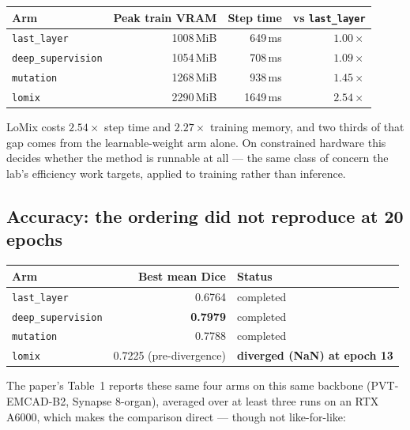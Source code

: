 \documentclass[11pt,a4paper]{article}
\newcommand{\code}[1]{\texttt{\small #1}}
\begin{document}
\begin{center}
\begin{tabular}{@{}lrrr@{}}
\toprule
\textbf{Arm} & \textbf{Peak train VRAM} & \textbf{Step time} &
\textbf{vs \code{last\_layer}} \\
\midrule
\code{last\_layer} & 1008\,MiB & 649\,ms & $1.00\times$ \\
\code{deep\_supervision} & 1054\,MiB & 708\,ms & $1.09\times$ \\
\code{mutation} & 1268\,MiB & 938\,ms & $1.45\times$ \\
\code{lomix} & 2290\,MiB & 1649\,ms & $\mathbf{2.54\times}$ \\
\bottomrule
\end{tabular}
\end{center}

LoMix costs $2.54\times$ step time and $2.27\times$ training memory, and two
thirds of that gap comes from the learnable-weight arm alone. On constrained
hardware this decides whether the method is runnable at all --- the same class
of concern the lab's efficiency work targets, applied to training rather than
inference.

\subsection{Accuracy: the ordering did not reproduce at 20 epochs}

\begin{center}
\begin{tabular}{@{}lrl@{}}
\toprule
\textbf{Arm} & \textbf{Best mean Dice} & \textbf{Status} \\
\midrule
\code{last\_layer} & 0.6764 & completed \\
\code{deep\_supervision} & \textbf{0.7979} & completed \\
\code{mutation} & 0.7788 & completed \\
\code{lomix} & 0.7225 (pre-divergence) & \textbf{diverged (NaN) at epoch 13} \\
\bottomrule
\end{tabular}
\end{center}

The paper's Table~1 reports these same four arms on this same backbone
(PVT-EMCAD-B2, Synapse 8-organ), averaged over at least three runs on an RTX
A6000, which makes the comparison direct --- though not like-for-like:
\end{document}
